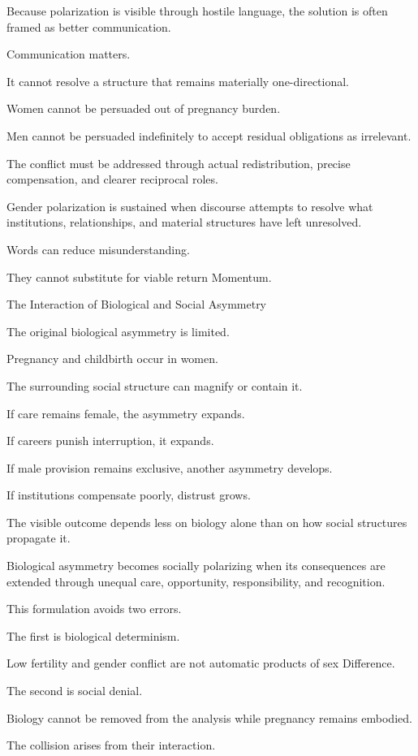 Because polarization is visible through hostile language, the solution is often framed as better communication.

Communication matters.

It cannot resolve a structure that remains materially one-directional.

Women cannot be persuaded out of pregnancy burden.

Men cannot be persuaded indefinitely to accept residual obligations as irrelevant.

The conflict must be addressed through actual redistribution, precise compensation, and clearer reciprocal roles.

Gender polarization is sustained when discourse attempts to resolve what institutions, relationships, and material structures have left unresolved.

Words can reduce misunderstanding.

They cannot substitute for viable return Momentum.

The Interaction of Biological and Social Asymmetry

The original biological asymmetry is limited.

Pregnancy and childbirth occur in women.

The surrounding social structure can magnify or contain it.

If care remains female, the asymmetry expands.

If careers punish interruption, it expands.

If male provision remains exclusive, another asymmetry develops.

If institutions compensate poorly, distrust grows.

The visible outcome depends less on biology alone than on how social structures propagate it.

Biological asymmetry becomes socially polarizing when its consequences are extended through unequal care, opportunity, responsibility, and recognition.

This formulation avoids two errors.

The first is biological determinism.

Low fertility and gender conflict are not automatic products of sex Difference.

The second is social denial.

Biology cannot be removed from the analysis while pregnancy remains embodied.

The collision arises from their interaction.

